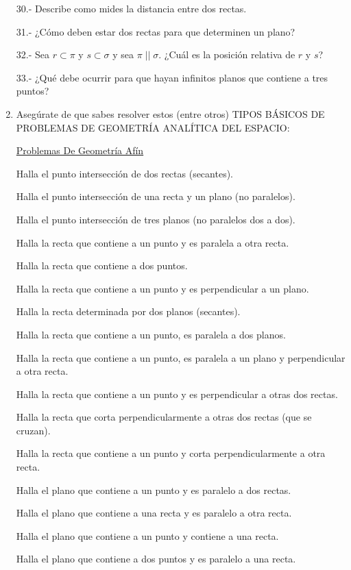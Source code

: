 \begin{enumerate}[Q1. ]
\begin{small}
30.- Describe como mides la distancia entre dos rectas. 

31.- ¿Cómo deben estar dos rectas para que determinen un plano?

32.- Sea $r\subset \pi$ y $s\subset \sigma$ y sea $\pi\; ||\;\sigma$. ¿Cuál es la posición relativa de $r$ y $s$?

33.- ¿Qué debe ocurrir para que hayan infinitos planos que contiene a tres puntos?
\end{small}

\item Asegúrate de que sabes resolver estos (entre otros) TIPOS BÁSICOS DE PROBLEMAS DE GEOMETRÍA ANALÍTICA DEL ESPACIO: 

\begin{small}
\underline{Problemas De Geometría Afín} 

Halla el punto intersección de dos rectas (secantes).

Halla el punto intersección de una recta y un plano (no paralelos).

Halla el punto intersección de tres planos (no paralelos dos a dos). 

Halla la recta que contiene a un punto y es paralela a otra recta.

Halla la recta que contiene a dos puntos.

Halla la recta que contiene a un punto y es perpendicular a un plano. 

Halla la recta determinada por dos planos (secantes). 

Halla la recta que contiene a un punto, es paralela a dos planos.

Halla la recta que contiene a un punto, es paralela a un plano y perpendicular a otra recta. 

Halla la recta que contiene a un punto y es perpendicular a otras dos rectas.

Halla la recta que corta perpendicularmente a otras dos rectas (que se cruzan).

Halla la recta que contiene a un punto y corta perpendicularmente a otra recta.

Halla el plano que contiene a un punto y es paralelo a dos rectas.

Halla el plano que contiene a una recta y es paralelo a otra recta.

Halla el plano que contiene a un punto y contiene a una recta.

Halla el plano que contiene a dos puntos y es paralelo a una recta. 


\end{small}
\end{enumerate}
